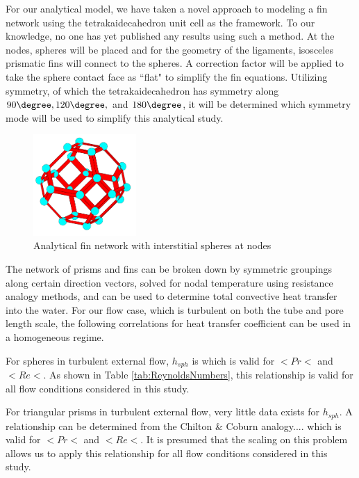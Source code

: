 \documentclass[compileTAMUreport.tex]{subfiles}
\begin{document}
For our analytical model, we have taken a novel approach to modeling a fin network using the tetrakaidecahedron unit cell as the framework.
To our knowledge, no one has yet published any results using such a method. 
At the nodes, spheres will be placed and for the geometry of the ligaments, isosceles prismatic fins will connect to the spheres. 
A correction factor will be applied to take the sphere contact face as ``flat" to simplify the fin equations. 
Utilizing symmetry, of which the tetrakaidecahedron has symmetry along $90\degree, 120\degree,$ and $180\degree$, it will be determined which symmetry mode will be used to simplify this analytical study.



\begin{figure}[t]
\begin{center}
\includegraphics[width=0.35\textwidth]{./figure/Cell_Analytical}
\end{center}
\caption{Analytical fin network with interstitial spheres at nodes}
\label{fig:flowregime}
\end{figure}

The network of prisms and fins can be broken down by symmetric groupings along certain direction vectors, solved for nodal temperature using resistance analogy methods, and can be used to determine total convective heat transfer into the water. 
For our flow case, which is turbulent on both the tube and pore length scale, the following correlations for heat transfer coefficient can be used in a homogeneous regime.

For spheres in turbulent external flow, $h_{sph}$ is
which is valid for $< Pr  < $ and $ < Re <$. 
As shown in Table \ref{tab:ReynoldsNumbers}, this relationship is valid for all flow conditions considered in this study.

For triangular prisms in turbulent external flow, very little data exists for $h_{sph}$. 
A relationship can be determined from the Chilton \& Coburn analogy.... %
which is valid for $< Pr  < $ and $ < Re <$. 
It is presumed that the scaling on this problem allows us to apply this relationship for all flow conditions considered in this study.
\end{document}
